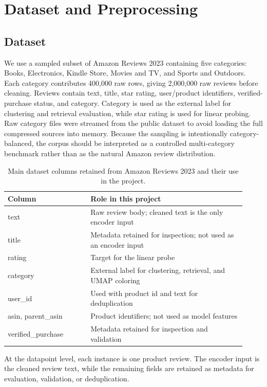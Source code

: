 \documentclass{article}
\begin{document}
\section{Dataset and Preprocessing}
\subsection{Dataset}
We use a sampled subset of Amazon Reviews 2023 \cite{hou2024bridging} containing five categories: Books, Electronics, Kindle Store, Movies and TV, and Sports and Outdoors. Each category contributes 400,000 raw rows, giving 2,000,000 raw reviews before cleaning. Reviews contain text, title, star rating, user/product identifiers, verified-purchase status, and category. Category is used as the external label for clustering and retrieval evaluation, while star rating is used for linear probing. Raw category files were streamed from the public dataset to avoid loading the full compressed sources into memory. Because the sampling is intentionally category-balanced, the corpus should be interpreted as a controlled multi-category benchmark rather than as the natural Amazon review distribution.

\begin{table}[H]
\centering
\footnotesize
\setlength{\tabcolsep}{2pt}
\renewcommand{\arraystretch}{1.04}
\begin{tabular}{@{}P{0.32\linewidth}P{0.60\linewidth}@{}}
\toprule
Column & Role in this project \\
\midrule
text & Raw review body; cleaned text is the only encoder input \\
title & Metadata retained for inspection; not used as an encoder input \\
rating & Target for the linear probe \\
category & External label for clustering, retrieval, and UMAP coloring \\
user\_id & Used with product id and text for deduplication \\
asin, parent\_asin & Product identifiers; not used as model features \\
verified\_purchase & Metadata retained for inspection and validation \\
\bottomrule
\end{tabular}
\caption{Main dataset columns retained from Amazon Reviews 2023 and their use in the project.}
\label{tab:dataset-fields}
\end{table}

At the datapoint level, each instance is one product review. The encoder input is the cleaned review text, while the remaining fields are retained as metadata for evaluation, validation, or deduplication.
\end{document}
